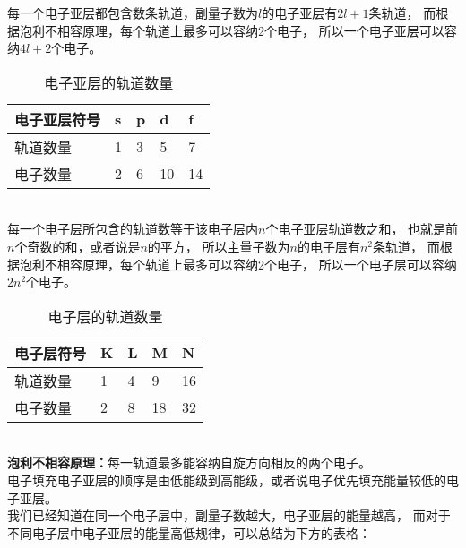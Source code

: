 \documentclass[UTF8]{ctexart}
\begin{document}
    每一个电子亚层都包含数条轨道，副量子数为$l$的电子亚层有$2l+1$条轨道，
    而根据泡利不相容原理，每个轨道上最多可以容纳2个电子，
    所以一个电子亚层可以容纳$4l+2$个电子。\vspace{5pt}
    \begin{table}[h]
        \begin{center}
            \begin{tabular}{l|l|l|l|l}
                \hline
                电子亚层符号\qquad\qquad&s\qquad\qquad&p\qquad\qquad&d\qquad\qquad&f\qquad\qquad\\ \hline
                轨道数量&1&3&5&7\\ \hline
                电子数量&2&6&10&14\\ \hline
            \end{tabular}
            \caption{电子亚层的轨道数量}
        \end{center}
    \end{table}\\
    每一个电子层所包含的轨道数等于该电子层内$n$个电子亚层轨道数之和，
    也就是前$n$个奇数的和，或者说是$n$的平方，
    所以主量子数为$n$的电子层有$n^2$条轨道，
    而根据泡利不相容原理，每个轨道上最多可以容纳2个电子，
    所以一个电子层可以容纳$2n^2$个电子。\vspace{5pt}
    \begin{table}[h]
        \begin{center}
            \begin{tabular}{l|l|l|l|l}
                \hline
                电子层符号\qquad\qquad&K\qquad\qquad&L\qquad\qquad&M\qquad\qquad&N\qquad\qquad\\ \hline
                轨道数量&1&4&9&16\\ \hline
                电子数量&2&8&18&32\\ \hline
            \end{tabular}
            \caption{电子层的轨道数量}
        \end{center}
    \end{table}\\
    \textbf{泡利不相容原理：}每一轨道最多能容纳自旋方向相反的两个电子。\\[6mm]
    电子填充电子亚层的顺序是由低能级到高能级，或者说电子优先填充能量较低的电子亚层。\\[3mm]
    我们已经知道在同一个电子层中，副量子数越大，电子亚层的能量越高，
    而对于不同电子层中电子亚层的能量高低规律，可以总结为下方的表格：\vspace{5pt}
\end{document}
